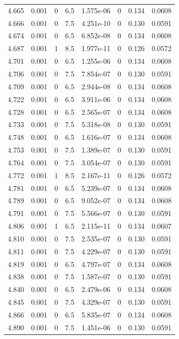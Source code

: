\documentclass[preview]{standalone}
\begin{document}
{{{{{{{{{{{{{\begin{tabular}{L{1.2cm}C{1.2cm} C{0.3cm}C{0.5cm} C{1.4cm}C{1.4cm} C{1.4cm}C{1.4cm}}
  4.665  &  0.001  & 0     & 6.5 &  1.575e-06  & 0  & 0.134 &  0.0608   \\ 
  4.666  &  0.001  & 0     & 7.5 &  4.251e-10  & 0  & 0.130 &  0.0591   \\ 
  4.674  &  0.001  & 0     & 6.5 &  6.852e-08  & 0  & 0.134 &  0.0608   \\ 
  4.687  &  0.001  & 1     & 8.5 &  1.977e-11  & 0  & 0.126 &  0.0572   \\ 
  4.701  &  0.001  & 0     & 6.5 &  1.255e-06  & 0  & 0.134 &  0.0608   \\ 
  4.706  &  0.001  & 0     & 7.5 &  7.854e-07  & 0  & 0.130 &  0.0591   \\ 
  4.709  &  0.001  & 0     & 6.5 &  2.944e-08  & 0  & 0.134 &  0.0608   \\ 
  4.722  &  0.001  & 0     & 6.5 &  3.911e-06  & 0  & 0.134 &  0.0608   \\ 
  4.728  &  0.001  & 0     & 6.5 &  2.565e-07  & 0  & 0.134 &  0.0608   \\ 
  4.733  &  0.001  & 0     & 7.5 &  5.318e-08  & 0  & 0.130 &  0.0591   \\ 
  4.748  &  0.001  & 0     & 6.5 &  1.616e-07  & 0  & 0.134 &  0.0608   \\ 
  4.753  &  0.001  & 0     & 7.5 &  1.389e-07  & 0  & 0.130 &  0.0591   \\ 
  4.764  &  0.001  & 0     & 7.5 &  3.054e-07  & 0  & 0.130 &  0.0591   \\ 
  4.772  &  0.001  & 1     & 8.5 &  2.167e-11  & 0  & 0.126 &  0.0572   \\ 
  4.781  &  0.001  & 0     & 6.5 &  5.239e-07  & 0  & 0.134 &  0.0608   \\ 
  4.789  &  0.001  & 0     & 6.5 &  9.052e-07  & 0  & 0.134 &  0.0608   \\ 
  4.791  &  0.001  & 0     & 7.5 &  5.566e-07  & 0  & 0.130 &  0.0591   \\ 
  4.806  &  0.001  & 1     & 6.5 &  2.115e-11  & 0  & 0.134 &  0.0607   \\ 
  4.810  &  0.001  & 0     & 7.5 &  2.535e-07  & 0  & 0.130 &  0.0591   \\ 
  4.811  &  0.001  & 0     & 7.5 &  4.229e-07  & 0  & 0.130 &  0.0591   \\ 
  4.819  &  0.001  & 0     & 6.5 &  4.797e-07  & 0  & 0.134 &  0.0608   \\ 
  4.838  &  0.001  & 0     & 7.5 &  1.587e-07  & 0  & 0.130 &  0.0591   \\ 
  4.840  &  0.001  & 0     & 6.5 &  2.479e-06  & 0  & 0.134 &  0.0608   \\ 
  4.845  &  0.001  & 0     & 7.5 &  4.329e-07  & 0  & 0.130 &  0.0591   \\ 
  4.866  &  0.001  & 0     & 6.5 &  5.835e-07  & 0  & 0.134 &  0.0608   \\ 
  4.890  &  0.001  & 0     & 7.5 &  1.451e-06  & 0  & 0.130 &  0.0591   \\ 
\hline 
\end{tabular} 

}}}}}}}}}}}}}
\end{document}
